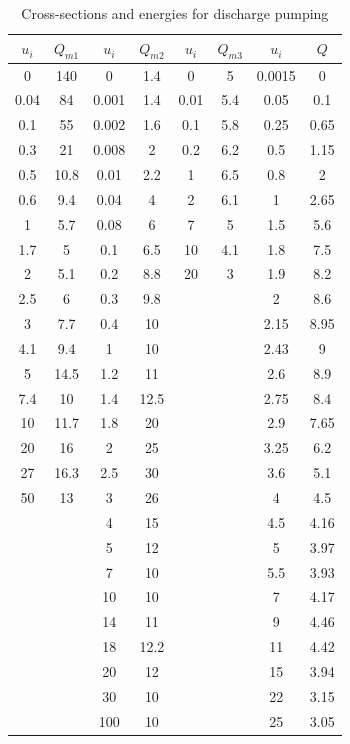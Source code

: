 \documentclass{report}
\begin{document}
\begin{appendices}
\begin{table}
\centering
\caption{Cross-sections and energies for discharge pumping}
\begin{tabular}{|c|c||c|c||c|c||c|c|}
\hline 
$u_i$ & $Q_{m1}$ & $u_i$ & $Q_{m2}$ & $u_i$ & $Q_{m3}$ & $u_i$ & $Q$ \\ 
\hline
0    & 140  & 0     & 1.4  & 0    & 5   & 0.0015 & 0    \\
0.04 & 84   & 0.001 & 1.4  & 0.01 & 5.4 & 0.05   & 0.1  \\
0.1  & 55   & 0.002 & 1.6  & 0.1  & 5.8 & 0.25   & 0.65 \\
0.3  & 21   & 0.008 & 2    & 0.2  & 6.2 & 0.5    & 1.15 \\
0.5  & 10.8 & 0.01  & 2.2  & 1    & 6.5 & 0.8    & 2    \\
0.6  & 9.4  & 0.04  & 4    & 2    & 6.1 & 1      & 2.65 \\
1    & 5.7  & 0.08  & 6    & 7    & 5   & 1.5    & 5.6  \\
1.7  & 5    & 0.1   & 6.5  & 10   & 4.1 & 1.8    & 7.5  \\
2    & 5.1  & 0.2   & 8.8  & 20   & 3   & 1.9    & 8.2  \\
2.5  & 6    & 0.3   & 9.8  &      &     & 2      & 8.6  \\
3    & 7.7  & 0.4   & 10   &      &     & 2.15   & 8.95 \\
4.1  & 9.4  & 1     & 10   &      &     & 2.43   & 9    \\
5    & 14.5 & 1.2   & 11   &      &     & 2.6    & 8.9  \\
7.4  & 10   & 1.4   & 12.5 &      &     & 2.75   & 8.4  \\
10   & 11.7 & 1.8   & 20   &      &     & 2.9    & 7.65 \\
20   & 16   & 2     & 25   &      &     & 3.25   & 6.2  \\
27   & 16.3 & 2.5   & 30   &      &     & 3.6    & 5.1  \\
50   & 13   & 3     & 26   &      &     & 4      & 4.5  \\
     &      & 4     & 15   &      &     & 4.5    & 4.16 \\
     &      & 5     & 12   &      &     & 5      & 3.97 \\
     &      & 7     & 10   &      &     & 5.5    & 3.93 \\
     &      & 10    & 10   &      &     & 7      & 4.17 \\
     &      & 14    & 11   &      &     & 9      & 4.46 \\
     &      & 18    & 12.2 &      &     & 11     & 4.42 \\
     &      & 20    & 12   &      &     & 15     & 3.94 \\
     &      & 30    & 10   &      &     & 22     & 3.15 \\
     &      & 100   & 10   &      &     & 25     & 3.05 \\
\hline
\end{tabular}
\end{table}


\end{appendices}
\end{document}
